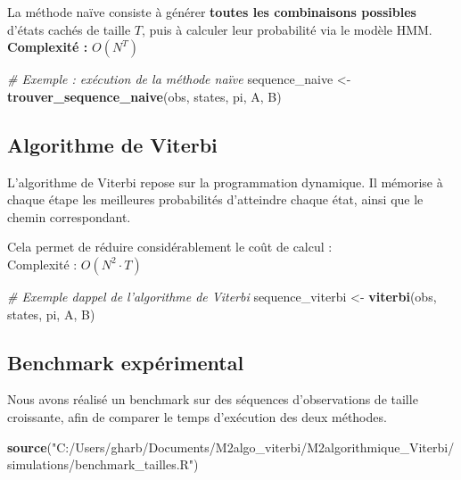 \documentclass[
]{article}
\newenvironment{Shaded}{\begin{snugshade}}{\end{snugshade}}
\newcommand{\CommentTok}[1]{\textcolor[rgb]{0.56,0.35,0.01}{\textit{#1}}}
\newcommand{\FunctionTok}[1]{\textcolor[rgb]{0.13,0.29,0.53}{\textbf{#1}}}
\newcommand{\NormalTok}[1]{#1}
\newcommand{\OtherTok}[1]{\textcolor[rgb]{0.56,0.35,0.01}{#1}}
\newcommand{\StringTok}[1]{\textcolor[rgb]{0.31,0.60,0.02}{#1}}
\begin{document}
La méthode naïve consiste à générer \textbf{toutes les combinaisons
possibles} d'états cachés de taille \(T\), puis à calculer leur
probabilité via le modèle HMM.\\
\textbf{Complexité :} \(O(N^T)\)

\begin{Shaded}
\begin{Highlighting}[]
\CommentTok{\# Exemple : exécution de la méthode naïve}
\NormalTok{sequence\_naive }\OtherTok{\textless{}{-}} \FunctionTok{trouver\_sequence\_naive}\NormalTok{(obs, states, pi, A, B)}
\end{Highlighting}
\end{Shaded}

\subsection{Algorithme de Viterbi}\label{algorithme-de-viterbi}

L'algorithme de Viterbi repose sur la programmation dynamique. Il
mémorise à chaque étape les meilleures probabilités d'atteindre chaque
état, ainsi que le chemin correspondant.

Cela permet de réduire considérablement le coût de calcul :\\
Complexité : \(O(N^2 \cdot T)\)

\begin{Shaded}
\begin{Highlighting}[]
\CommentTok{\# Exemple d\textquotesingle{}appel de l’algorithme de Viterbi}
\NormalTok{sequence\_viterbi }\OtherTok{\textless{}{-}} \FunctionTok{viterbi}\NormalTok{(obs, states, pi, A, B)}
\end{Highlighting}
\end{Shaded}

\subsection{Benchmark expérimental}\label{benchmark-expuxe9rimental}

Nous avons réalisé un benchmark sur des séquences d'observations de
taille croissante, afin de comparer le temps d'exécution des deux
méthodes.

\begin{Shaded}
\begin{Highlighting}[]
\FunctionTok{source}\NormalTok{(}\StringTok{"C:/Users/gharb/Documents/M2algo\_viterbi/M2algorithmique\_Viterbi/simulations/benchmark\_tailles.R"}\NormalTok{)}
\end{Highlighting}
\end{Shaded}
\end{document}
